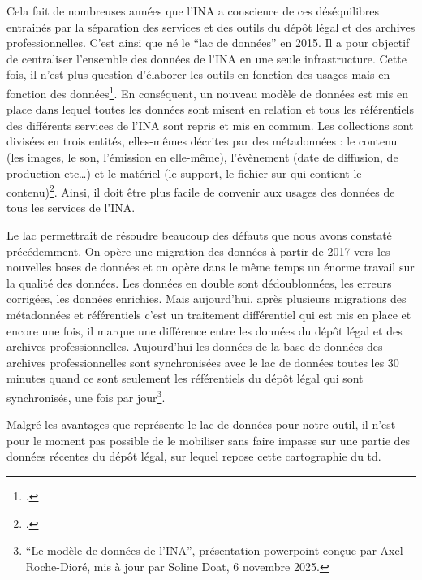 Cela fait de nombreuses années que l'INA a conscience de ces déséquilibres entrainés par la séparation des services et des outils du dépôt légal et des archives professionnelles. C'est ainsi que né le \enquote{lac de données} en 2015. Il a pour objectif de centraliser l'ensemble des données de l'INA en une seule infrastructure. Cette fois, il n'est plus question d'élaborer les outils en fonction des usages mais en fonction des données\footcite[]{institutnationaldhistoiredelartinha2019a}. En conséquent, un nouveau modèle de données est mis en place dans lequel toutes les données sont misent en relation et tous les référentiels des différents services de l'INA sont repris et mis en commun. Les collections sont divisées en trois entités, elles-mêmes décrites par des métadonnées : le contenu (les images, le son, l'émission en elle-même), l'évènement (date de diffusion, de production etc\dots) et le matériel (le support, le fichier sur qui contient le contenu)\footcite[87]{bassaïstéguy2025}. Ainsi, il doit être plus facile de convenir aux usages des données de tous les services de l'INA. 

Le lac permettrait de résoudre beaucoup des défauts que nous avons constaté précédemment. On opère une migration des données à partir de 2017 vers les nouvelles bases de données et on opère dans le même temps un énorme travail sur la qualité des données. Les données en double sont dédoublonnées, les erreurs corrigées, les données enrichies. Mais aujourd'hui, après plusieurs migrations des métadonnées et référentiels c'est un traitement différentiel qui est mis en place et encore une fois, il marque une différence entre les données du dépôt légal et des archives professionnelles. Aujourd'hui les données de la base de données des archives professionnelles sont synchronisées avec le lac de données toutes les 30 minutes quand ce sont seulement les référentiels du dépôt légal qui sont synchronisés, une fois par jour\footnote{\enquote{Le modèle de données de l'INA}, présentation powerpoint conçue par Axel Roche-Dioré, mis à jour par Soline Doat, 6 novembre 2025.}.  

Malgré les avantages que représente le lac de données pour notre outil, il n'est pour le moment pas possible de le mobiliser sans faire impasse sur une partie des données récentes du dépôt légal, sur lequel repose cette cartographie du \gls{td}. 